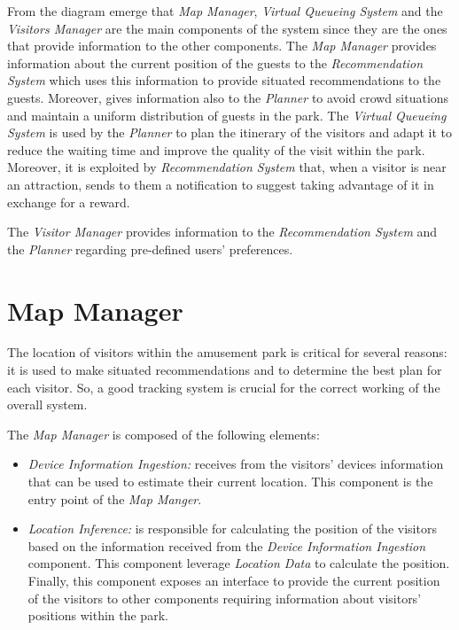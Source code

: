 From the diagram emerge that \textit{Map Manager}, \textit{Virtual Queueing System} and the \textit{Visitors Manager} are the main components of the
system since they are the ones that provide information to the other components. The \textit{Map Manager} provides information about the current
position of the guests to the \textit{Recommendation System} which uses this information to provide situated recommendations to the guests. Moreover, gives
information also to the \textit{Planner} to avoid crowd situations and maintain a uniform distribution of guests in the park. The \textit{Virtual
	Queueing System} is used by the \textit{Planner} to plan the itinerary of the visitors and adapt it to reduce the waiting time and improve the quality
of the visit within the park.
Moreover, it is exploited by \textit{Recommendation System} that, when a visitor is near an attraction, sends to them a notification to suggest taking advantage of it in exchange for a reward.

The \textit{Visitor Manager} provides information to the \textit{Recommendation System} and the \textit{Planner} regarding
pre-defined users' preferences.

\section{Map Manager}

The location of visitors within the amusement park is critical for several reasons: it is used to make situated recommendations and to determine the best plan
for each visitor. So, a good tracking system is crucial for the correct working of the overall system.

The \textit{Map Manager} is composed of the following elements:
\begin{itemize}
	\item \textit{Device Information Ingestion:} receives from the visitors' devices information that can be used to estimate their current location. This component is the entry point of the \textit{Map Manger}.
	\item \textit{Location Inference:} is responsible for calculating the position of the visitors based on the information received from the
	      \textit{Device Information Ingestion} component. This component leverage \textit{Location Data} to calculate the position.
	      Finally, this component exposes an interface to provide the current position of the visitors to other components requiring information about visitors' positions within the park.
\end{itemize}


